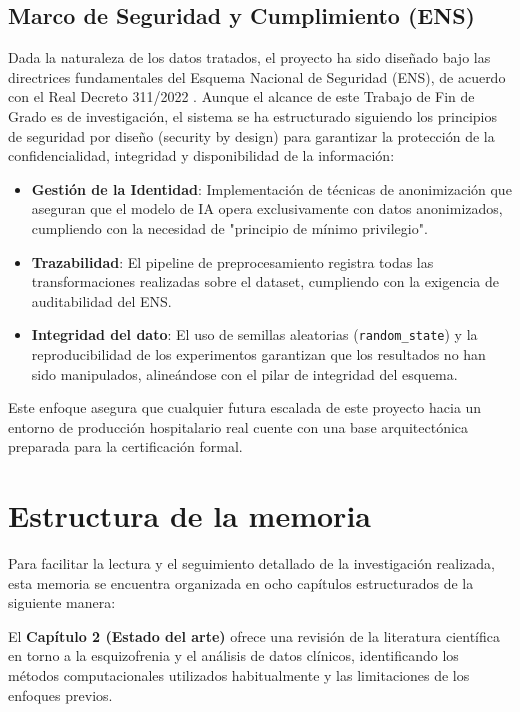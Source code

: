 \documentclass[12pt,a4paper,onecolumn,oneside]{report}
\begin{document}
\subsection{Marco de Seguridad y Cumplimiento (ENS)}
Dada la naturaleza de los datos tratados, el proyecto ha sido diseñado bajo las directrices fundamentales del Esquema Nacional de Seguridad (ENS), de acuerdo con el Real Decreto 311/2022 \cite{real_decreto_311_2022}. Aunque el alcance de este Trabajo de Fin de Grado es de investigación, el sistema se ha estructurado siguiendo los principios de seguridad por diseño (security by design) para garantizar la protección de la confidencialidad, integridad y disponibilidad de la información:
\begin{itemize}
    \item \textbf{Gestión de la Identidad}: Implementación de técnicas de anonimización que aseguran que el modelo de IA opera exclusivamente con datos anonimizados, cumpliendo con la necesidad de "principio de mínimo privilegio".

    \item \textbf{Trazabilidad}: El pipeline de preprocesamiento registra todas las transformaciones realizadas sobre el dataset, cumpliendo con la exigencia de auditabilidad del ENS.

    \item \textbf{Integridad del dato}: El uso de semillas aleatorias (\texttt{random\_state}) y la reproducibilidad de los experimentos garantizan que los resultados no han sido manipulados, alineándose con el pilar de integridad del esquema.
\end{itemize}
Este enfoque asegura que cualquier futura escalada de este proyecto hacia un entorno de producción hospitalario real cuente con una base arquitectónica preparada para la certificación formal.

\section{Estructura de la memoria}

Para facilitar la lectura y el seguimiento detallado de la investigación realizada, esta memoria se encuentra organizada en ocho capítulos estructurados de la siguiente manera:

El \textbf{Capítulo 2 (Estado del arte)} ofrece una revisión de la literatura científica en torno a la esquizofrenia y el análisis de datos clínicos, identificando los métodos computacionales utilizados habitualmente y las limitaciones de los enfoques previos.
\end{document}
